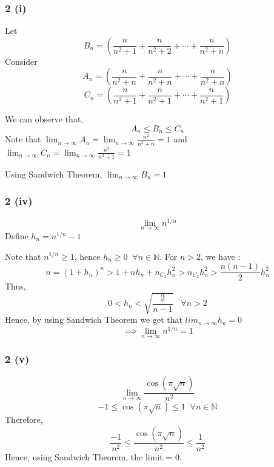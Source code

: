 \documentclass{beamer}
\begin{document}
\begin{frame}
    \frametitle{2 (i)}

    Let \[B_{n} =  \left (\frac{n}{n^{2}+1} + \frac{n}{n^{2}+2} + \cdots + \frac{n}{n^{2}+n}\right)  \] \pause
    Consider 
    \[A_{n} =   \left (\frac{n}{n^{2}+n} + \frac{n}{n^{2}+n} + \cdots + \frac{n}{n^{2}+n}\right)  \] 
    \[C_{n} =   \left (\frac{n}{n^{2}+1} + \frac{n}{n^{2}+1} + \cdots + \frac{n}{n^{2}+1}\right)  \]\pause

    We can observe that, \pause
    \[A_{n} \le B_{n} \le C_{n} \] 
    Note that \(\lim_{n \rightarrow \infty } A_{n} = \lim_{n \rightarrow \infty} \frac{n^2}{n^2+n} = 1 \) and \pause
    \(\lim_{n \rightarrow \infty } C_{n} = \lim_{n \rightarrow \infty} \frac{n^2}{n^2+1} = 1 \) \pause

    Using Sandwich Theorem, \(\lim_{n \rightarrow \infty } B_{n} = 1\)
\end{frame}


\begin{frame}
    \frametitle{2 (iv)}

    \[\lim_{n \rightarrow \infty} n^{1/n} \]\pause
    Define $h_{n} = n^{1/n} - 1$\pause

    Note that $n^{1/n} \ge 1$, hence $h_{n} \ge 0 \; \; \forall n \in \mathbb{N}$. 
    For $ n > 2$, we have :\pause
    \[n = (1 + h_{n})^{n} > 1 + nh_{n}+n_{C_{2}}h_{n}^{2} > n_{C_{2}}h_{n}^{2}> \frac{n(n-1)}{2}h_{n}^{2} \]\pause
    Thus,  \[0 < h_{n} < \sqrt{\frac{2}{n-1}} \; \; \; \forall n > 2 \] \pause
    Hence, by using Sandwich Theorem we get that \(lim_{n \rightarrow \infty}h_{n} = 0 \)
    \[ \implies \lim_{n \rightarrow \infty} n^{1/n} = 1 \]
\end{frame}


\begin{frame}
    \frametitle{2 (v)}

    \[\lim_{n \rightarrow \infty} \frac{\cos(\pi \sqrt{n})}{n^{2}}\] \pause
    \[-1 \le \cos(\pi \sqrt{n}) \le 1 \; \; \forall n \in \mathbb{N} \] \pause
    Therefore,
    \[ \frac{-1}{n^{2}} \le \frac{\cos(\pi \sqrt{n})}{n^{2}} \le  \frac{1}{n^{2}}\] \pause
    \[\]
    Hence, using Sandwich Theorem, the limit = 0.
\end{frame}
\end{document}
